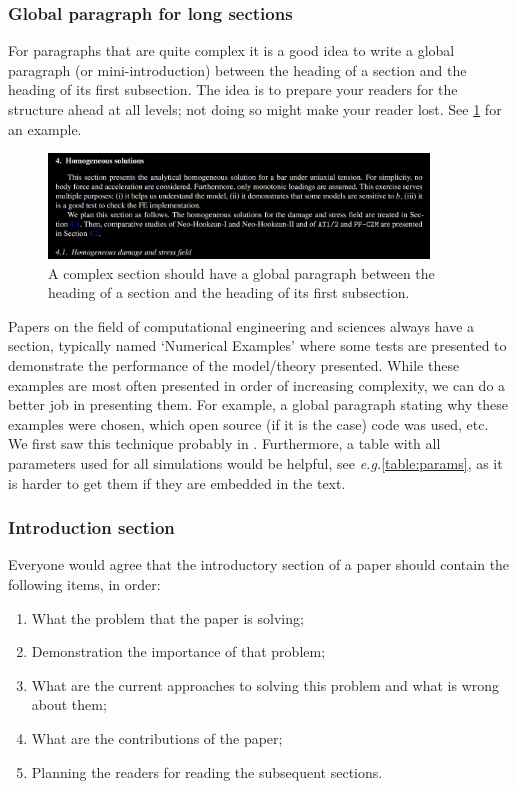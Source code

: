 \documentclass[authoryear,3p,times,preprint,review,fleqn]{elsarticle}
\newcommand{\eg}{\textit{e.g.}\xspace}
\numberwithin{equation}{section}
\theoremstyle{remark}
\begin{document}
\subsubsection{Global paragraph for long sections}\label{sec:global-para}

For paragraphs that are quite complex it is a good idea to write a global paragraph (or mini-introduction) between the heading of a section and the heading of its first subsection. The idea is  to prepare your readers for the structure ahead at all levels; not doing so might make your reader lost. See \cref{fig:section} for an example. 


\begin{figure}[!h]
  \centering
  \includegraphics[width=0.9\textwidth]{section}
  \caption{A complex section should have a global paragraph between the heading of a section and the heading of its first subsection.}
  \label{fig:section}
\end{figure}


Papers on the field of computational engineering and sciences always have a section, typically named `Numerical Examples' where some tests are presented to demonstrate the performance of the model/theory presented. While these examples are most often presented in order of increasing complexity, we can do a better job in presenting them. For example, a global paragraph stating why these examples were chosen, which open source (if it is the case) code was used, etc. We first saw this technique probably in \cite{huang2003modeling}. Furthermore, a table with all parameters used for all simulations would be helpful, see \eg \cref{table:params}, as it is harder to get them if they are embedded in the text.

\subsubsection{Introduction section}\label{sec:introduction-part}

Everyone would agree that the introductory section of a paper should contain the following items, in order:

\begin{enumerate}
\item What the problem that the paper is solving;
\item Demonstration the importance of that problem;
\item What are the current approaches to solving this problem and what is wrong about them;
\item What are the contributions of the paper; 
\item Planning  the readers for reading the subsequent sections.
\end{enumerate}
\end{document}
